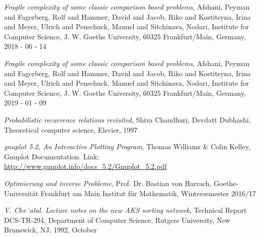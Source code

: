 \label{Bibliography}	%
\begin{thebibliography}{9}
  \textit{Fragile complexity of some classic comparison based problems}, 
  Afshani, Peyman and Fagerberg, Rolf and Hammer, David and Jacob, Riko and Kostitsyna, Irina and Meyer, Ulrich and Penschuck, Manuel and Sitchinava, Nodari, 
  Institute for Computer Science, J. W. Goethe University, 60325 Frankfurt/Main, Germany, 2018 - 06 - 14

  \textit{Fragile complexity of some classic comparison based problems}, Afshani, Peyman and Fagerberg, Rolf and Hammer, David and Jacob, Riko and Kostitsyna, Irina and Meyer, Ulrich and Penschuck, Manuel and Sitchinava, Nodari, 
  Institute for Computer Science, J. W. Goethe University, 60325 Frankfurt/Main, Germany, 2019 - 01 - 09

	\textit{Probabilistic recurrence relations revisited}, Shiva Chaudhuri, Devdatt Dubhashi,
	Theoretical computer science, Elsvier, 1997

	\textit{gnuplot 5.2, An Interactive Plotting Program}, Thomas Williams \& Colin Kelley, Gnuplot Documentation. \newline Link: \url{http://www.gnuplot.info/docs_5.2/Gnuplot_5.2.pdf}

	\textit{Optimierung und inverse Probleme}, Prof. Dr. Bastian von Harrach, Goethe-Universität Frankfurt am Main
Institut für Mathematik, Wintersemester 2016/17

	\textit{V. Chv´atal. Lecture notes on the new AKS sorting network},  Technical Report DCS-TR-294, Department of Computer Science, Rutgers University, New Brunswick, NJ, 1992, October
	
	




  
\end{thebibliography}
